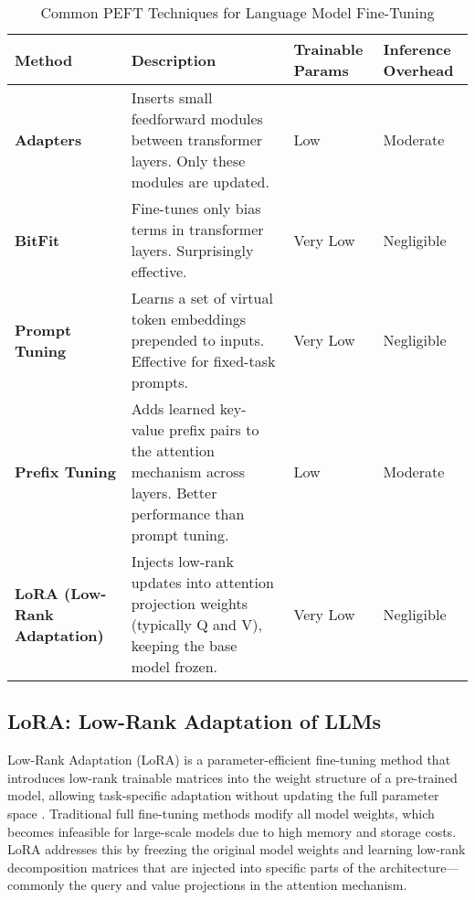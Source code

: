 \begin{table}[H]
  \centering
  \scriptsize
  \begin{tabularx}{0.95\textwidth}{
    >{\raggedright\arraybackslash}p{3cm}
    >{\raggedright\arraybackslash}X
    >{\centering\arraybackslash}p{2cm}
    >{\centering\arraybackslash}p{2cm}
  }
    \toprule
    \textbf{Method} & \textbf{Description} & \textbf{Trainable Params} & \textbf{Inference Overhead} \\
    \midrule
    \textbf{Adapters} & Inserts small feedforward modules between transformer layers. Only these modules are updated. & Low & Moderate \\
    \textbf{BitFit} & Fine-tunes only bias terms in transformer layers. Surprisingly effective. & Very Low & Negligible \\
    \textbf{Prompt Tuning} & Learns a set of virtual token embeddings prepended to inputs. Effective for fixed-task prompts. & Very Low & Negligible \\
    \textbf{Prefix Tuning} & Adds learned key-value prefix pairs to the attention mechanism across layers. Better performance than prompt tuning. & Low & Moderate \\
    \textbf{LoRA (Low-Rank Adaptation)} & Injects low-rank updates into attention projection weights (typically Q and V), keeping the base model frozen. & Very Low & Negligible \\
    \bottomrule
  \end{tabularx}
  \caption{Common PEFT Techniques for Language Model Fine-Tuning}
\end{table}

\subsection{LoRA: Low-Rank Adaptation of LLMs}

Low-Rank Adaptation (LoRA) is a parameter-efficient fine-tuning method that introduces
low-rank trainable matrices into the weight structure of a pre-trained model, allowing
task-specific adaptation without updating the full parameter space \cite{hu2022lora}. Traditional full
fine-tuning methods modify all model weights, which becomes infeasible for large-scale
models due to high memory and storage costs. LoRA addresses this by freezing the
original model weights and learning low-rank decomposition matrices that are injected
into specific parts of the architecture—commonly the query and value projections in the
attention mechanism.

